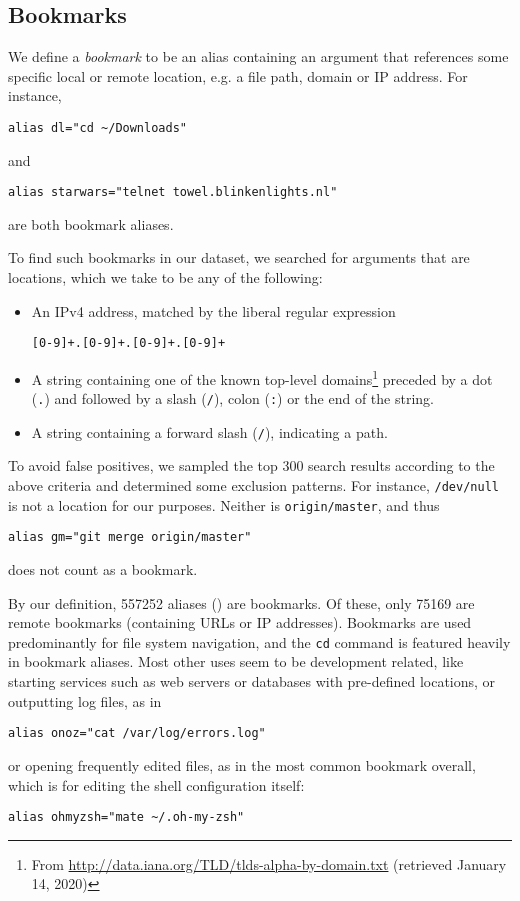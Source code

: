\subsection{Bookmarks}

We define a \emph{bookmark} to be an alias containing an argument that references some specific local or remote location, e.g. a file path, domain or IP address.
For instance, 
\begin{verbatim}
alias dl="cd ~/Downloads"
\end{verbatim}
and
\begin{verbatim}
alias starwars="telnet towel.blinkenlights.nl"
\end{verbatim}
are both bookmark aliases.

To find such bookmarks in our dataset, we searched for arguments that are locations, which we take to be any of the following:
\begin{itemize}
    \item An IPv4 address, matched by the liberal regular expression
\begin{verbatim}[0-9]+.[0-9]+.[0-9]+.[0-9]+\end{verbatim}
    \item A string containing one of the known top-level domains\footnote{From \url{http://data.iana.org/TLD/tlds-alpha-by-domain.txt} (retrieved January 14, 2020)} preceded by a dot (\verb|.|) and followed by a slash (\verb|/|), colon (\verb|:|) or the end of the string.
    \item A string containing a forward slash (\verb|/|), indicating a path.
\end{itemize}
To avoid false positives, we sampled the top 300 search results according to the above criteria and determined some exclusion patterns.
For instance, \texttt{/dev/null} is not a location for our purposes.
Neither is \texttt{origin/master}, and thus 
\begin{verbatim}
alias gm="git merge origin/master"
\end{verbatim}
does not count as a bookmark.

By our definition, \num{557252} aliases () are bookmarks.
Of these, only \num{75169} are remote bookmarks (containing URLs or IP addresses).
Bookmarks are used predominantly for file system navigation, and the \texttt{cd} command is featured heavily in bookmark aliases.
Most other uses seem to be development related, like starting services such as web servers or databases with pre-defined locations, or outputting log files, as in 
\begin{verbatim}
alias onoz="cat /var/log/errors.log"
\end{verbatim}
or opening frequently edited files, as in the most common bookmark overall, which is for editing the shell configuration itself:
\begin{verbatim}
alias ohmyzsh="mate ~/.oh-my-zsh"
\end{verbatim}
